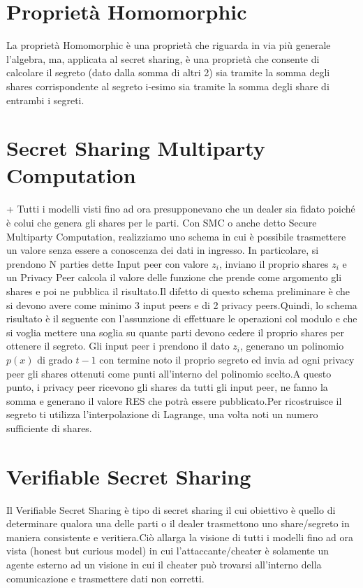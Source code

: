 \documentclass{book}
\begin{document}
\section{Proprietà Homomorphic}
La proprietà Homomorphic è una proprietà che riguarda in via più generale l'algebra, ma, applicata al secret sharing, è una proprietà che consente di calcolare il segreto (dato dalla somma di altri 2) sia tramite la somma degli shares corrispondente al segreto i-esimo sia tramite la somma degli share di entrambi i segreti.
\section{Secret Sharing Multiparty Computation}+
Tutti i modelli visti fino ad ora presupponevano che un dealer sia fidato poiché è colui che genera gli shares per le parti. Con SMC o anche detto Secure Multiparty Computation, realizziamo uno schema in cui è possibile trasmettere un valore senza essere a conoscenza dei dati in ingresso\@.\newline
In particolare, si prendono N parties dette Input peer con valore \(z_{i}\), inviano il proprio shares \(z_{i}\) e un Privacy Peer calcola il valore delle funzione che prende come argomento gli shares e poi ne pubblica il risultato.Il difetto di questo schema preliminare è che si devono avere come minimo 3 input peers e di 2 privacy peers.Quindi, lo schema risultato è il seguente con l'assunzione di effettuare le operazioni col modulo e che si voglia mettere una soglia su quante parti devono cedere il proprio shares per ottenere il segreto\@.\newline
Gli input peer i prendono il dato \(z_{i}\), generano un polinomio \(p(x)\) di grado \(t-1\) con termine noto il proprio segreto ed invia ad ogni privacy peer gli shares ottenuti come punti all'interno del polinomio scelto.A questo punto, i privacy peer ricevono gli shares da tutti gli input peer, ne fanno la somma e generano il valore RES che potrà essere pubblicato.Per ricostruisce il segreto ti utilizza l'interpolazione di Lagrange, una volta noti un numero sufficiente di shares.
\section{Verifiable Secret Sharing}
Il Verifiable Secret Sharing è tipo di secret sharing il cui obiettivo è quello di determinare qualora una delle parti o il dealer trasmettono uno share/segreto in maniera consistente e veritiera.Ciò allarga la visione di tutti i modelli fino ad ora vista (honest but curious model) in cui l'attaccante/cheater è solamente un agente esterno ad un visione in cui il cheater può trovarsi all'interno della comunicazione e trasmettere dati non corretti.
\end{document}
